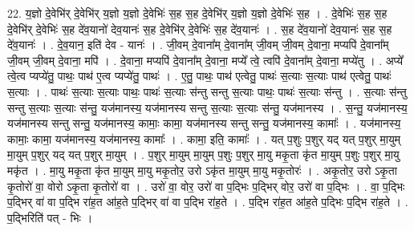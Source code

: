 \documentclass[17pt]{extarticle}
\begin{document}
22. य॒ज्ञो दे॒वेभि॑र् दे॒वेभि॑र् य॒ज्ञो य॒ज्ञो दे॒वेभिः॑ स॒ह स॒ह दे॒वेभि॑र् य॒ज्ञो य॒ज्ञो दे॒वेभिः॑ स॒ह । . दे॒वेभिः॑ स॒ह स॒ह दे॒वेभि॑र् दे॒वेभिः॑ स॒ह दे॑व॒यानो॑ देव॒यानः॑ स॒ह दे॒वेभि॑र् दे॒वेभिः॑ स॒ह दे॑व॒यानः॑ । . स॒ह दे॑व॒यानो॑ देव॒यानः॑ स॒ह स॒ह दे॑व॒यानः॑ । . दे॒व॒यान॒ इति॑ देव - यानः॑ । . जी॒वम् दे॒वाना᳚म् दे॒वाना᳚म् जी॒वम् जी॒वम् दे॒वाना॒ मप्यपि॑ दे॒वाना᳚म् जी॒वम् जी॒वम् दे॒वाना॒ मपि॑ । . दे॒वाना॒ मप्यपि॑ दे॒वाना᳚म् दे॒वाना॒ मप्ये᳚ त्वे॒ त्वपि॑ दे॒वाना᳚म् दे॒वाना॒ मप्ये॑तु । . अप्ये᳚ त्वे॒त्व प्यप्ये॑तु॒ पाथः॒ पाथ॑ ए॒त्व प्यप्ये॑तु॒ पाथः॑ । . ए॒तु॒ पाथः॒ पाथ॑ एत्वेतु॒ पाथः॑ स॒त्याः स॒त्याः पाथ॑ एत्वेतु॒ पाथः॑ स॒त्याः । . पाथः॑ स॒त्याः स॒त्याः पाथः॒ पाथः॑ स॒त्याः स॑न्तु सन्तु स॒त्याः पाथः॒ पाथः॑ स॒त्याः स॑न्तु । . स॒त्याः स॑न्तु सन्तु स॒त्याः स॒त्याः स॑न्तु॒ यज॑मानस्य॒ यज॑मानस्य सन्तु स॒त्याः स॒त्याः स॑न्तु॒ यज॑मानस्य । . स॒न्तु॒ यज॑मानस्य॒ यज॑मानस्य सन्तु सन्तु॒ यज॑मानस्य॒ कामाः॒ कामा॒ यज॑मानस्य सन्तु सन्तु॒ यज॑मानस्य॒ कामाः᳚ । . यज॑मानस्य॒ कामाः॒ कामा॒ यज॑मानस्य॒ यज॑मानस्य॒ कामाः᳚ । . कामा॒ इति॒ कामाः᳚ । . यत् प॒शुः प॒शुर् यद् यत् प॒शुर् मा॒युम् मा॒युम् प॒शुर् यद् यत् प॒शुर् मा॒युम् । . प॒शुर् मा॒युम् मा॒युम् प॒शुः प॒शुर् मा॒यु मकृ॒ता कृ॑त मा॒युम् प॒शुः प॒शुर् मा॒यु मकृ॑त । . मा॒यु मकृ॒ता कृ॑त मा॒युम् मा॒यु मकृ॒तोर॒ उरो ऽकृ॑त मा॒युम् मा॒यु मकृ॒तोरः॑ । . अकृ॒तोर॒ उरो ऽकृ॒ता कृ॒तोरो॑ वा॒ वोरो ऽकृ॒ता कृ॒तोरो॑ वा । . उरो॑ वा॒ वोर॒ उरो॑ वा प॒द्भिः प॒द्भिर् वोर॒ उरो॑ वा प॒द्भिः । . वा॒ प॒द्भिः प॒द्भिर् वा॑ वा प॒द्भि रा॑ह॒त आ॑ह॒ते प॒द्भिर् वा॑ वा प॒द्भि रा॑ह॒ते । . प॒द्भि रा॑ह॒त आ॑ह॒ते प॒द्भिः प॒द्भि रा॑ह॒ते । . प॒द्भिरिति॑ पत् - भिः । \newline
\end{document}
